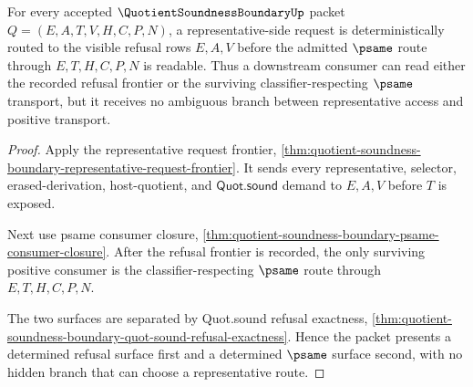 \begin{theorem}
\label{thm:quotient-soundness-boundary-psame-request-determinacy}
For every accepted $\QuotientSoundnessBoundaryUp$ packet $Q=(E,A,T,V,H,C,P,N)$, a representative-side request is deterministically routed to the visible refusal rows $E,A,V$ before the admitted $\psame$ route through $E,T,H,C,P,N$ is readable. Thus a downstream consumer can read either the recorded refusal frontier or the surviving classifier-respecting $\psame$ transport, but it receives no ambiguous branch between representative access and positive transport.
\end{theorem}
\begin{proof}
Apply the representative request frontier, \autoref{thm:quotient-soundness-boundary-representative-request-frontier}. It sends every representative, selector, erased-derivation, host-quotient, and $\mathsf{Quot.sound}$ demand to $E,A,V$ before $T$ is exposed.

Next use psame consumer closure, \autoref{thm:quotient-soundness-boundary-psame-consumer-closure}. After the refusal frontier is recorded, the only surviving positive consumer is the classifier-respecting $\psame$ route through $E,T,H,C,P,N$.

The two surfaces are separated by Quot.sound refusal exactness, \autoref{thm:quotient-soundness-boundary-quot-sound-refusal-exactness}. Hence the packet presents a determined refusal surface first and a determined $\psame$ surface second, with no hidden branch that can choose a representative route.
\end{proof}

